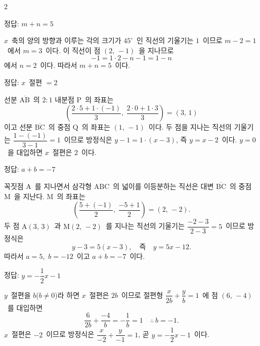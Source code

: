 \documentclass[10pt,fleqn]{article}
\begin{document}
\begin{multicols*}{2}

\begin{dmanswerbox}
정답: $m+n=5$
\end{dmanswerbox}

$x$\ 축의 양의 방향과 이루는 각의 크기가 $45^{\circ}$\ 인 직선의 기울기는 $1$\ 이므로 $m - 2 = 1$\ 에서 $m = 3$\ 이다. 이 직선이 점 $(2,\, -1)$\ 을 지나므로
\[ -1 = 1 \cdot 2 - n - 1 = 1 - n \]
에서 $n = 2$\ 이다. 따라서 $m + n = 5$\ 이다.

\begin{dmanswerbox}
정답: $x$\ 절편 $= 2$
\end{dmanswerbox}

선분 $\overline{\mathrm{AB}}$\ 의 $2 : 1$ 내분점 $\mathrm{P}$\ 의 좌표는
\[ \left( \dfrac{2 \cdot 5 + 1 \cdot (-1)}{3},\ \dfrac{2 \cdot 0 + 1 \cdot 3}{3} \right) = (3,\, 1) \]
이고 선분 $\overline{\mathrm{BC}}$\ 의 중점 $\mathrm{Q}$\ 의 좌표는 $\left( 1,\, -1 \right)$\ 이다. 두 점을 지나는 직선의 기울기는 $\dfrac{1-(-1)}{3-1} = 1$\ 이므로 방정식은 $y - 1 = 1 \cdot (x - 3)$, 즉 $y = x - 2$\ 이다. $y = 0$\ 을 대입하면 $x$\ 절편은 $2$\ 이다.

\begin{dmanswerbox}
정답: $a+b=-7$
\end{dmanswerbox}

꼭짓점 $\mathrm{A}$\ 를 지나면서 삼각형 $\mathrm{ABC}$\ 의 넓이를 이등분하는 직선은 대변 $\overline{\mathrm{BC}}$\ 의 중점 $\mathrm{M}$\ 을 지난다. $\mathrm{M}$\ 의 좌표는
\[ \left( \dfrac{5+(-1)}{2},\ \dfrac{-5+1}{2} \right) = (2,\, -2). \]
두 점 $\mathrm{A}(3,\, 3)$\ 과 $\mathrm{M}(2,\, -2)$\ 를 지나는 직선의 기울기는 $\dfrac{-2-3}{2-3} = 5$\ 이므로 방정식은
\[ y - 3 = 5(x - 3),\quad \text{즉}\quad y = 5x - 12. \]
따라서 $a = 5$,\ $b = -12$\ 이고 $a + b = -7$\ 이다.

\begin{dmanswerbox}
정답: $y=-\dfrac{1}{2}x-1$
\end{dmanswerbox}

$y$\ 절편을 $b$($b \ne 0$)라 하면 $x$\ 절편은 $2b$\ 이므로 절편형 $\dfrac{x}{2b} + \dfrac{y}{b} = 1$\ 에 점 $(6,\, -4)$\ 를 대입하면
\[ \dfrac{6}{2b} + \dfrac{-4}{b} = -\dfrac{1}{b} = 1 \quad\therefore\ b = -1. \]
$x$\ 절편은 $-2$\ 이므로 방정식은 $\dfrac{x}{-2} + \dfrac{y}{-1} = 1$, 곧 $y = -\dfrac{1}{2}x - 1$\ 이다.


\end{multicols*}
\end{document}
